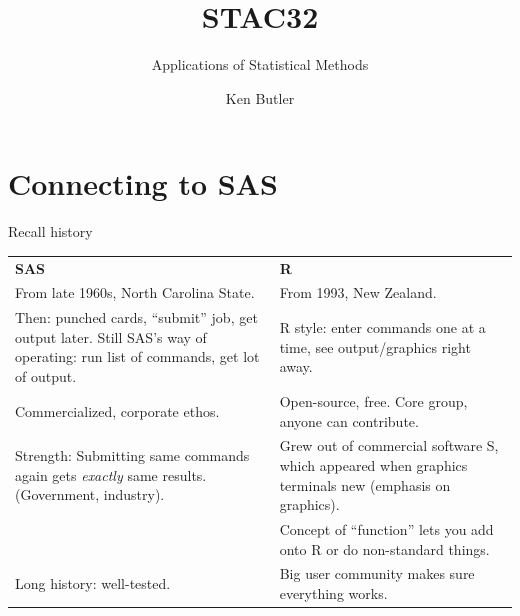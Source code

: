 \documentclass[unknownkeysallowed]{beamer}\usepackage[]{graphicx}\usepackage[]{color}
\title{STAC32}
\subtitle{Applications of Statistical Methods}
\author{Ken Butler}
\begin{document}







\section{Connecting to SAS}

\frame{\sectionpage}


\begin{frame}{Recall history}
  
  \begin{tabular}{p{}p{}}
    \textbf{SAS} & \textbf{R}\\
    From late 1960s, North Carolina State.&
From 1993, New Zealand.\\                                            
    Then: punched cards, ``submit'' job, get output later.
    Still SAS's way of operating: run list of commands, get lot
      of output.& R style: enter commands one at a time, see output/graphics
      right away.\\
                 
    Commercialized, corporate ethos.             & Open-source, free. Core group, anyone can contribute.\\
    Strength: Submitting same commands again gets \emph{exactly}
      same results. (Government, industry).& 
    Grew out of commercial software S, which appeared when
      graphics terminals new (emphasis on graphics).\\
                                             & Concept of ``function'' lets you add onto R or do
      non-standard things.\\
    Long history: well-tested.&Big user community makes sure everything works.
    
  \end{tabular}
  
  \end{frame}
\end{document}
